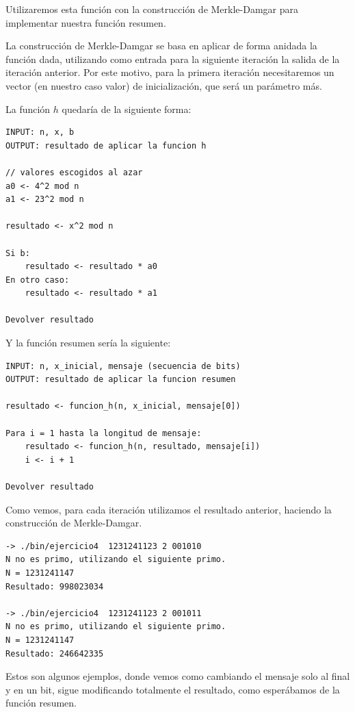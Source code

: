 \documentclass[12pt, spanish]{article}
\begin{document}
Utilizaremos esta función con la construcción de Merkle-Damgar para implementar nuestra función resumen.

La construcción de Merkle-Damgar se basa en aplicar de forma anidada la función dada, utilizando como entrada para la siguiente iteración la salida de la iteración anterior. Por este motivo, para la primera iteración necesitaremos un vector (en nuestro caso valor) de inicialización, que será un parámetro más.

La función $h$ quedaría de la siguiente forma:


\begin{lstlisting}[caption={Funcion h}]
INPUT: n, x, b
OUTPUT: resultado de aplicar la funcion h

// valores escogidos al azar
a0 <- 4^2 mod n
a1 <- 23^2 mod n

resultado <- x^2 mod n

Si b:
	resultado <- resultado * a0
En otro caso:
	resultado <- resultado * a1

Devolver resultado
\end{lstlisting}

Y la función resumen sería la siguiente:

\begin{lstlisting}[caption={Funcion resumen}]
INPUT: n, x_inicial, mensaje (secuencia de bits)
OUTPUT: resultado de aplicar la funcion resumen

resultado <- funcion_h(n, x_inicial, mensaje[0])

Para i = 1 hasta la longitud de mensaje:
	resultado <- funcion_h(n, resultado, mensaje[i])
	i <- i + 1

Devolver resultado
\end{lstlisting}

Como vemos, para cada iteración utilizamos el resultado anterior, haciendo la construcción de Merkle-Damgar.


\begin{lstlisting}
-> ./bin/ejercicio4  1231241123 2 001010
N no es primo, utilizando el siguiente primo.
N = 1231241147
Resultado: 998023034

-> ./bin/ejercicio4  1231241123 2 001011
N no es primo, utilizando el siguiente primo.
N = 1231241147
Resultado: 246642335
\end{lstlisting}

Estos son algunos ejemplos, donde vemos como cambiando el mensaje solo al final y en un bit, sigue modificando totalmente el resultado, como esperábamos de la función resumen.
\end{document}
